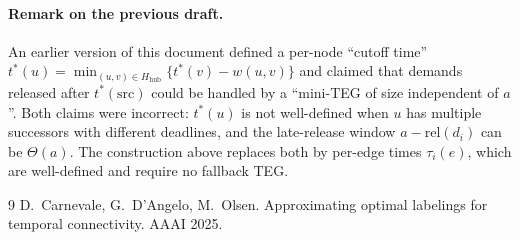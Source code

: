 \documentclass[12pt, a4paper]{article}
\begin{document}
\paragraph{Remark on the previous draft.}
An earlier version of this document defined a per-node ``cutoff time'' $t^*(u)=\min_{(u,v)\in H_\mathrm{hub}}\{t^*(v)-w(u,v)\}$ and claimed that demands released after $t^*(\mathrm{src})$ could be handled by a ``mini-TEG of size independent of $a$''. Both claims were incorrect: $t^*(u)$ is not well-defined when $u$ has multiple successors with different deadlines, and the late-release window $a-\mathrm{rel}(d_i)$ can be $\Theta(a)$. The construction above replaces both by per-edge times $\tau_i(e)$, which are well-defined and require no fallback TEG.

\begin{thebibliography}{9}
 D.~Carnevale, G.~D'Angelo, M.~Olsen. Approximating optimal labelings for temporal connectivity. AAAI 2025.
\end{thebibliography}
\end{document}
